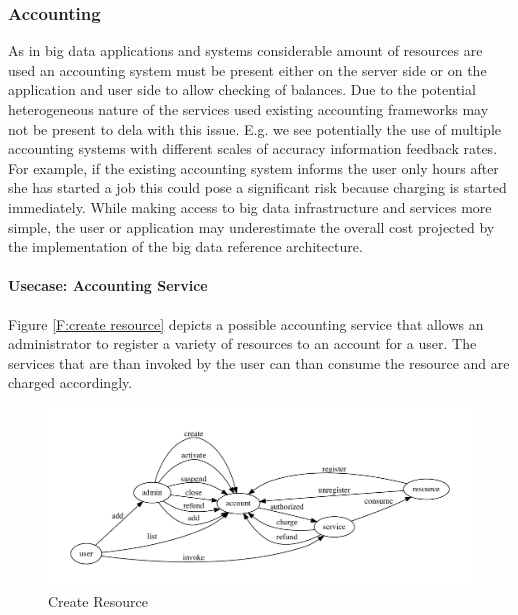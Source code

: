 \documentclass[10pt]{article}
\begin{document}

 
\subsubsection{Accounting}


As in big data applications and systems considerable amount of
resources are used an accounting system must be present either on the
server side or on the application and user side to allow checking of
balances. Due to the potential heterogeneous nature of the services
used existing accounting frameworks may not be present to dela with
this issue. E.g. we see potentially the use of multiple accounting
systems with different scales of accuracy information feedback
rates. For example, if the existing accounting system informs the user
only hours after she has started a job this could pose a significant
risk because charging is started immediately. While making access to
big data infrastructure and services more simple, the user or
application may underestimate the overall cost projected by the
implementation of the big data reference architecture.



\paragraph{Usecase: Accounting Service}

Figure \ref{F:create resource} depicts a possible accounting service that allows an administrator to register a variety of resources to an account for a user. The services that are than invoked by the user can than consume the resource and are charged accordingly.

\begin{figure}[!h]
\includegraphics[width=\columnwidth]{images/dot/account.pdf}
\caption{Create Resource}\label{F:createresource}
\end{figure}
\end{document}
